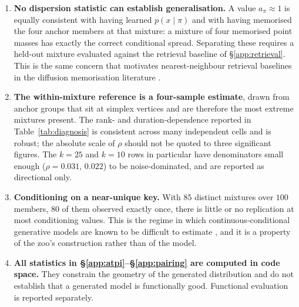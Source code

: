 \begin{enumerate}
\item \textbf{No dispersion statistic can establish generalisation.} A value
$a_\pi \approx 1$ is equally consistent with having learned $p(x \mid \pi)$ and with
having memorised the four anchor members at that mixture: a mixture of four memorised
point masses has exactly the correct conditional spread. Separating these requires a
held-out mixture evaluated against the retrieval baseline of
\S\ref{app:retrieval}. This is the same concern that motivates nearest-neighbour
retrieval baselines in the diffusion memorisation
literature \cite{carlini2023extracting,somepalli2023replication}.

\item \textbf{The within-mixture reference is a four-sample estimate}, drawn from
anchor groups that sit at simplex vertices and are therefore the most extreme
mixtures present. The rank- and duration-dependence reported in
Table~\ref{tab:diagnosis} is consistent across many independent cells and is robust;
the absolute scale of $\rho$ should not be quoted to three significant figures. The
$k = 25$ and $k = 10$ rows in particular have denominators small enough
($\rho = 0.031$, $0.022$) to be noise-dominated, and are reported as directional only.

\item \textbf{Conditioning on a near-unique key.} With $85$ distinct mixtures over
$100$ members, $80$ of them observed exactly once, there is little or no replication
at most conditioning values. This is the regime in which continuous-conditional
generative models are known to be difficult to estimate \cite{ding2021ccgan}, and it
is a property of the zoo's construction rather than of the model.

\item \textbf{All statistics in \S\ref{app:atpi}--\S\ref{app:pairing} are computed in
code space.} They constrain the geometry of the generated distribution and do not
establish that a generated model is functionally good. Functional evaluation is
reported separately.
\end{enumerate}

